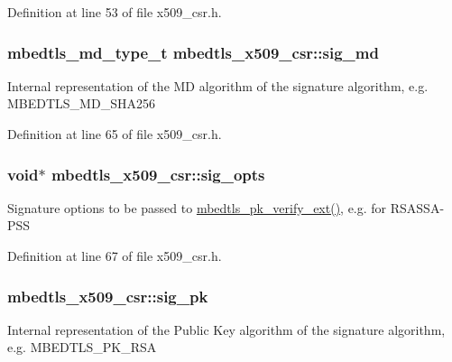 Definition at line 53 of file x509\-\_\-csr.\-h.

\hypertarget{structmbedtls__x509__csr_afaf345aa794cfd4b5056ce49a67bb611}{
\subsubsection[{sig\-\_\-md}]{\setlength{\rightskip}{0pt plus 5cm}mbedtls\-\_\-md\-\_\-type\-\_\-t mbedtls\-\_\-x509\-\_\-csr\-::sig\-\_\-md}}\label{structmbedtls__x509__csr_afaf345aa794cfd4b5056ce49a67bb611}
Internal representation of the M\-D algorithm of the signature algorithm, e.\-g. M\-B\-E\-D\-T\-L\-S\-\_\-\-M\-D\-\_\-\-S\-H\-A256 

Definition at line 65 of file x509\-\_\-csr.\-h.

\hypertarget{structmbedtls__x509__csr_ac1152e686c27158c211b2c3fdfaefdb7}{
\subsubsection[{sig\-\_\-opts}]{\setlength{\rightskip}{0pt plus 5cm}void$\ast$ mbedtls\-\_\-x509\-\_\-csr\-::sig\-\_\-opts}}\label{structmbedtls__x509__csr_ac1152e686c27158c211b2c3fdfaefdb7}
Signature options to be passed to \hyperlink{pk_8h_a81f0c5e40b839f5eca676c2c2752036f}{mbedtls\-\_\-pk\-\_\-verify\-\_\-ext()}, e.\-g. for R\-S\-A\-S\-S\-A-\/\-P\-S\-S 

Definition at line 67 of file x509\-\_\-csr.\-h.

\hypertarget{structmbedtls__x509__csr_a670fac5f5b5cd7398e1b241dc257bc97}{
\subsubsection[{sig\-\_\-pk}]{ mbedtls\-\_\-x509\-\_\-csr\-::sig\-\_\-pk}}\label{structmbedtls__x509__csr_a670fac5f5b5cd7398e1b241dc257bc97}
Internal representation of the Public Key algorithm of the signature algorithm, e.\-g. M\-B\-E\-D\-T\-L\-S\-\_\-\-P\-K\-\_\-\-R\-S\-A 

